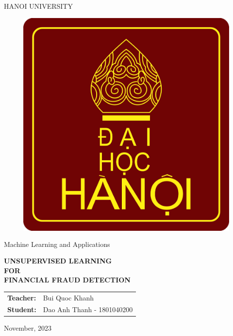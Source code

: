 \begin{titlepage}
    \begin{center}
        \large HANOI UNIVERSITY
        \vspace{1cm}
        \begin{figure}[H]
            \centering
            \includegraphics[width=0.35\linewidth]{front/img/logo.png}
        \end{figure}
        \vspace{1cm}
        
        \Large
        Machine Learning and Applications
        
        \vspace{2cm}
        \large
        \textbf{UNSUPERVISED LEARNING\\FOR\\FINANCIAL FRAUD DETECTION} 
    
        \vspace{2cm}
        \begin{table}[h!]
        \centering
        \begin{tabular}{ll}
        \textbf{Teacher:} & Bui Quoc Khanh \\
         \textbf{Student:} & Dao Anh Thanh - 1801040200 \\ 
        \end{tabular}
        \end{table}
    	
    	\vfill
    	\large November, 2023
    \end{center}
\end{titlepage}